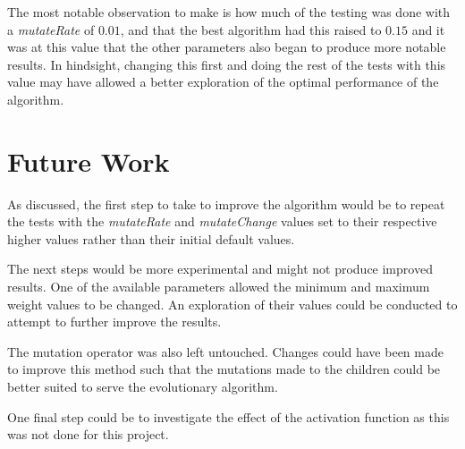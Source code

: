 \documentclass[sigconf]{acmart}
\begin{document}
The most notable observation to make is how much of the testing was done with a \textit{mutateRate} of $0.01$, and that the best algorithm had this raised to $0.15$ and it was at this value that the other parameters also began to produce more notable results. In hindsight, changing this first and doing the rest of the tests with this value may have allowed a better exploration of the optimal performance of the algorithm.
\section{Future Work}
As discussed, the first step to take to improve the algorithm would be to repeat the tests with the \textit{mutateRate} and \textit{mutateChange} values set to their respective higher values rather than their initial default values.

The next steps would be more experimental and might not produce improved results. One of the available parameters allowed the minimum and maximum weight values to be changed. An exploration of their values could be conducted to attempt to further improve the results.

The mutation operator was also left untouched. Changes could have been made to improve this method such that the mutations made to the children could be better suited to serve the evolutionary algorithm.

One final step could be to investigate the effect of the activation function as this was not done for this project.


 
\end{document}
